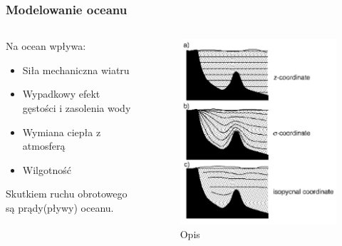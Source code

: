 \documentclass{beamer}
\begin{document}
\begin{frame}
	\frametitle{Modelowanie oceanu}
	\begin{columns}
		\begin{column}{0.5\textwidth}
			Na ocean wpływa:
			\begin{itemize}
				\item Siła mechaniczna wiatru
				\item Wypadkowy efekt gęstości i zasolenia wody
				\item Wymiana ciepła z atmosferą
				\item Wilgotność
			\end{itemize}
			Skutkiem ruchu obrotowego są prądy(pływy) oceanu.			

		\end{column}
		\begin{column}{0.5\textwidth}
				\begin{figure}[h]
					\begin{center}
						\includegraphics[width=0.8\linewidth]{images/Figure5.png}
						\caption{Opis}
					\end{center}
				\end{figure}
		\end{column}

	\end{columns}

	
\end{frame}
\end{document}
